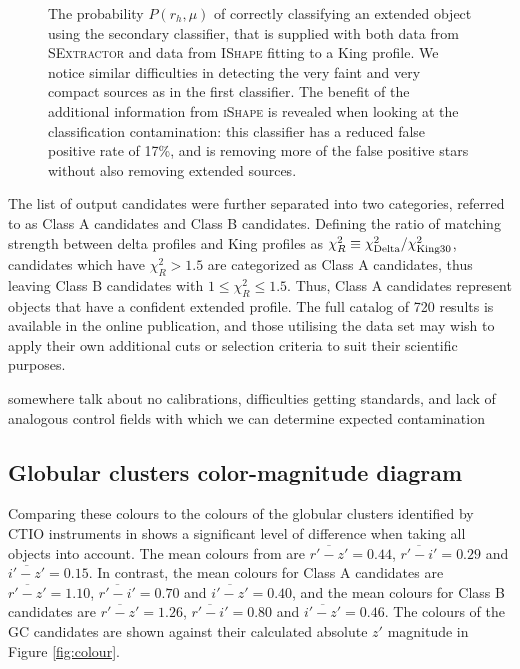 \documentclass[useAMS,usenatbib]{mn2e}
\begin{document}
\begin{figure}
\begin{minipage}[t]{.49\textwidth}
		\caption{The probability $P(r_h, \mu)$ of correctly classifying an extended object using the secondary classifier, that is supplied with both data from \textsc{SExtractor} and data from \textsc{IShape} fitting to a King profile. We notice similar difficulties in detecting the very faint and very compact sources as in the first classifier. The benefit of the additional information from \textsc{iShape} is revealed when looking at the classification contamination: this classifier has a reduced false positive rate of 17\%, and is removing more of the false positive stars without also removing extended sources.}
		\label{fig:comp2}
	\end{minipage}
\end{figure}

The list of output candidates were further separated into two categories, referred to as Class A candidates and Class B candidates. Defining the ratio of matching strength between delta profiles and King profiles as $\chi^2_R \equiv \chi^2_{\rm{Delta}}  / \chi^2_{\rm{King30}}$, candidates which have  $\chi^2_R > 1.5$ are categorized as Class A candidates, thus leaving Class B candidates with $1 \leq \chi^2_R \leq 1.5$. Thus, Class A candidates represent objects that have a confident extended profile. The full catalog of 720 results is available in the online publication, and those utilising the data set may wish to apply their own additional cuts or selection criteria to suit their scientific purposes.


{\color{red} somewhere talk about no calibrations, difficulties getting standards, and lack of analogous control fields with which we can determine expected contamination}







\subsection{Globular clusters color-magnitude diagram}
\label{sec:gc_cmd}



 Comparing these colours to the colours of the globular clusters identified by CTIO instruments in \citet{Vanderbeke2014} shows a significant level of difference when taking all objects into account. The mean colours from \citet{Vanderbeke2014} are $\overline{r'-z'} = 0.44$, $\overline{r'-i'} = 0.29$ and $\overline{i'-z'} = 0.15$. In contrast, the mean colours for Class A candidates are $\overline{r'-z'} = 1.10$, $\overline{r'-i'} = 0.70$ and $\overline{i'-z'} = 0.40$, and the mean colours for Class B candidates are $\overline{r'-z'} = 1.26$, $\overline{r'-i'} = 0.80$ and $\overline{i'-z'} = 0.46$. The colours of the GC candidates are shown against their calculated absolute $z'$ magnitude in Figure \ref{fig:colour}.
 
\end{document}
